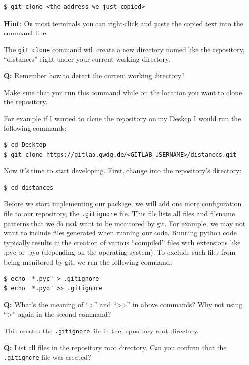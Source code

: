 \documentclass[11pt]{article}
\begin{document}
\begin{verbatim}
$ git clone <the_address_we_just_copied>
\end{verbatim}

\textbf{Hint}: On most terminals you can right-click and paste the
copied text into the command line.

The \texttt{git\ clone} command will create a new directory named like
the repository, ``distances'' right under your current working
directory.

\textbf{Q:} Remember how to detect the current working directory?

Make sure that you run this command while on the location you want to
clone the repository.

For example if I wanted to clone the repository on my Deskop I would run
the following commands:

\begin{verbatim}
$ cd Desktop
$ git clone https://gitlab.gwdg.de/<GITLAB_USERNAME>/distances.git
\end{verbatim}

    Now it's time to start developing. First, change into the repository's
directory:

\begin{verbatim}
$ cd distances
\end{verbatim}

    Before we start implementing our package, we will add one more
configuration file to our repository, the \texttt{.gitignore} file. This
file lists all files and filename patterns that we do \textbf{not} want
to be monitored by git. For example, we may not want to include files
generated when running our code. Running python code typically results
in the creation of various ``compiled'' files with extensions like .pyc
or .pyo (depending on the operating system). To exclude such files from
being monitored by git, we run the following command:

\begin{verbatim}
$ echo "*.pyc" > .gitignore
$ echo "*.pyo" >> .gitignore
\end{verbatim}

\textbf{Q:} What's the meaning of ``\textgreater{}'' and
``\textgreater\textgreater{}'' in above commands? Why not using
``\textgreater{}'' again in the second command?

    This creates the \texttt{.gitignore} file in the repository root
directory.

\textbf{Q:} List all files in the repository root directory. Can you
confirm that the \texttt{.gitignore} file was created?
\end{document}
